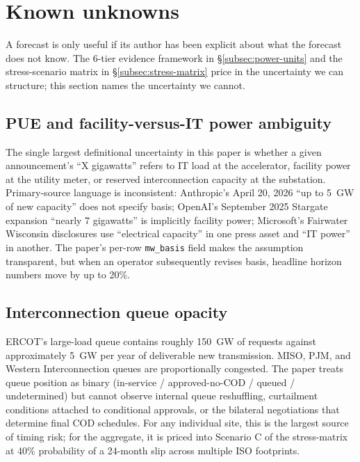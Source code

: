 \documentclass[11pt,a4paper]{article}
\begin{document}
\section{Known unknowns}

A forecast is only useful if its author has been explicit about what the forecast does not know. The 6-tier evidence framework in \S\ref{subsec:power-units} and the stress-scenario matrix in \S\ref{subsec:stress-matrix} price in the uncertainty we can structure; this section names the uncertainty we cannot.

\subsection{PUE and facility-versus-IT power ambiguity}

The single largest definitional uncertainty in this paper is whether a given announcement's ``X gigawatts'' refers to IT load at the accelerator, facility power at the utility meter, or reserved interconnection capacity at the substation. Primary-source language is inconsistent: Anthropic's April 20, 2026 ``up to 5~GW of new capacity'' does not specify basis; OpenAI's September 2025 Stargate expansion ``nearly 7 gigawatts'' is implicitly facility power; Microsoft's Fairwater Wisconsin disclosures use ``electrical capacity'' in one press asset and ``IT power'' in another. The paper's per-row \texttt{mw\_basis} field makes the assumption transparent, but when an operator subsequently revises basis, headline horizon numbers move by up to 20\%.

\subsection{Interconnection queue opacity}

ERCOT's large-load queue contains roughly 150~GW of requests against approximately 5~GW per year of deliverable new transmission. MISO, PJM, and Western Interconnection queues are proportionally congested. The paper treats queue position as binary (in-service / approved-no-COD / queued / undetermined) but cannot observe internal queue reshuffling, curtailment conditions attached to conditional approvals, or the bilateral negotiations that determine final COD schedules. For any individual site, this is the largest source of timing risk; for the aggregate, it is priced into Scenario C of the stress-matrix at 40\% probability of a 24-month slip across multiple ISO footprints.
\end{document}
